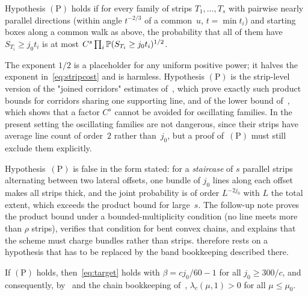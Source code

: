 \documentclass[11pt,letterpaper]{article}
\begin{document}
\begin{definition}
\label{def:parallel}
Hypothesis $\mathrm{(P)}$ holds if for every family of strips $T_1,\dots,T_s$ with pairwise nearly parallel directions (within angle $t^{-2/3}$ of a common~$u$, $t=\min t_i$) and starting boxes along a common walk as above, the probability that all of them have $S_{T_i}\ge j_0t_i$ is at most $C^s\prod_i\P(S_{T_i}\ge j_0t_i)^{1/2}$.
\end{definition}

The exponent $1/2$ is a placeholder for any uniform positive power; it halves the exponent in~\eqref{eq:stripcost} and is harmless. Hypothesis $\mathrm{(P)}$ is the strip-level version of the "joined corridors" estimates of~\cite{JC26,ORC26}, which prove exactly such product bounds for corridors sharing one supporting line, and of the lower bound of~\cite{OSC26}, which shows that a factor $C^s$ cannot be avoided for oscillating families. In the present setting the oscillating families are not dangerous, since their strips have average line count of order~$2$ rather than~$j_0$, but a proof of~$\mathrm{(P)}$ must still exclude them explicitly.

\begin{remark}
\label{rem:Pfalse}
Hypothesis~$\mathrm{(P)}$ is false in the form stated: for a \emph{staircase} of $s$ parallel strips alternating between two lateral offsets, one bundle of $j_0$ lines along each offset makes all strips thick, and the joint probability is of order $L^{-2j_0}$ with $L$ the total extent, which exceeds the product bound for large~$s$. The follow-up note proves the product bound under a bounded-multiplicity condition (no line meets more than $\rho$ strips), verifies that condition for bent convex chains, and explains that the scheme must charge bundles rather than strips.  therefore rests on a hypothesis that has to be replaced by the band bookkeeping described there.
\end{remark}

\begin{proposition}
\label{prop:conditional}
If $\mathrm{(P)}$ holds, then~\eqref{eq:target} holds with $\beta=cj_0/60-1$ for all $j_0\ge300/c$, and consequently, by~\cite[Theorem~1.2]{FM26} and the chain bookkeeping of~\cite[Section~3.1]{FM26}, $\lambda_c(\mu,1)>0$ for all $\mu\le\mu_0$.
\end{proposition}
\end{document}
